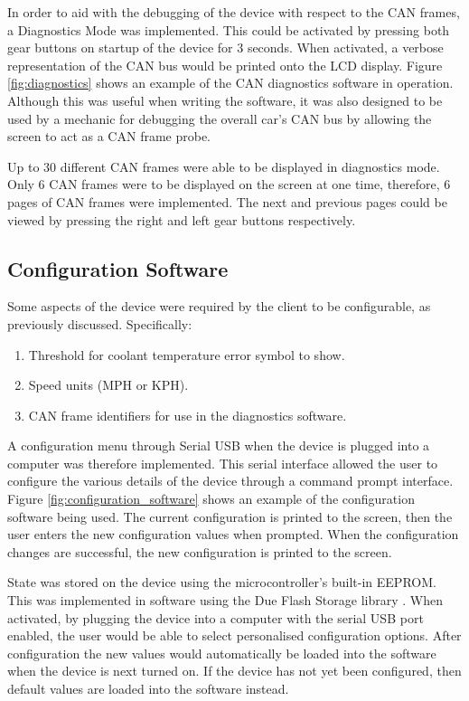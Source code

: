 \documentclass[a4paper,12pt]{article}
\begin{document}
In order to aid with the debugging of the device with respect to the CAN frames, a Diagnostics Mode was implemented. This could be activated by pressing both gear buttons on startup of the device for 3 seconds. When activated, a verbose representation of the CAN bus would be printed onto the LCD display. Figure \ref{fig:diagnostics} shows an example of the CAN diagnostics software in operation. Although this was useful when writing the software, it was also designed to be used by a mechanic for debugging the overall car’s CAN bus by allowing the screen to act as a CAN frame probe.



Up to 30 different CAN frames were able to be displayed in diagnostics mode. Only 6 CAN frames were to be displayed on the screen at one time, therefore, 6 pages of CAN frames were implemented. The next and previous pages could be viewed by pressing the right and left gear buttons respectively.

\subsection{Configuration Software}
\label{sec:configuration_software}

Some aspects of the device were required by the client to be configurable, as previously discussed. Specifically:

\begin{enumerate}
  \item Threshold for coolant temperature error symbol to show.
  \item Speed units (MPH or KPH).
  \item CAN frame identifiers for use in the diagnostics software.
\end{enumerate}

A configuration menu through Serial USB when the device is plugged into a computer was therefore implemented. This serial interface allowed the user to configure the various details of the device through a command prompt interface. Figure \ref{fig:configuration_software} shows an example of the configuration software being used. The current configuration is printed to the screen, then the user enters the new configuration values when prompted. When the configuration changes are successful, the new configuration is printed to the screen.



State was stored on the device using the microcontroller's built-in EEPROM. This was implemented in software using the Due Flash Storage library \cite{due_flash_storage}. When activated, by plugging the device into a computer with the serial USB port enabled, the user would be able to select personalised configuration options. After configuration the new values would automatically be loaded into the software when the device is next turned on. If the device has not yet been configured, then default values are loaded into the software instead.
\end{document}
